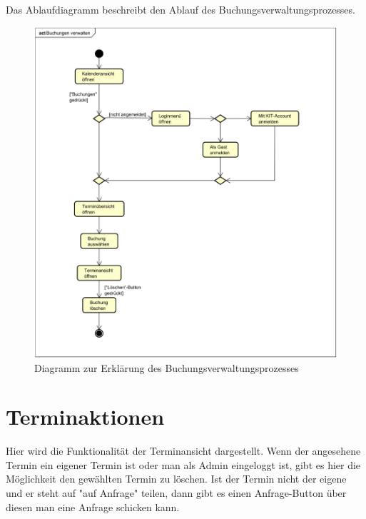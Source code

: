 Das Ablaufdiagramm beschreibt den Ablauf des Buchungsverwaltungsprozesses.

\begin{figure}[ht]
    \centering
    \includegraphics[width=\textwidth]{figures/activity/buchungverwalten}
    \caption{Diagramm zur Erklärung des Buchungsverwaltungsprozesses}
    \label{fig:manage-booking-diagram}
\end{figure}
\clearpage

\section{Terminaktionen}

Hier wird die Funktionalität der Terminansicht dargestellt. Wenn der angesehene Termin ein eigener Termin ist
oder man als Admin eingeloggt ist, gibt es hier die Möglichkeit den gewählten Termin zu löschen. Ist der
Termin nicht der eigene und er steht auf "auf Anfrage" teilen, dann gibt es einen Anfrage-Button über diesen man
eine Anfrage schicken kann.

